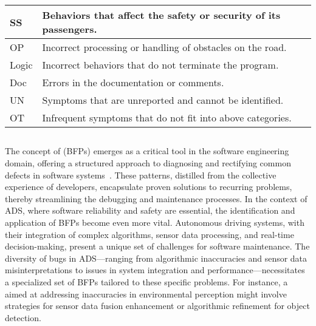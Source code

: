 \begin{table}[ht!]
\begin{minipage}{0.47\linewidth}
\begin{adjustbox}{width=\linewidth}
\begin{tabular}{|l|l|}
        SS & Behaviors that affect the safety or security of its passengers. \\
        \hline
        OP & Incorrect processing or handling of obstacles on the road. \\
        \hline
        Logic & Incorrect behaviors that do not terminate the program. \\
        \hline
        Doc & Errors in the documentation or comments. \\
        \hline
        UN & Symptoms that are unreported and cannot be identified. \\
        \hline
        OT & Infrequent symptoms that do not fit into above categories. \\
        \hline
        \end{tabular}
        \end{adjustbox}
        \label{tab:symptoms_ads}
    \end{minipage}
\end{table}


\subsection{\BFPs}

The concept of \bfps (BFPs) emerges as a critical tool in the software engineering domain, offering a structured approach to diagnosing and rectifying common defects in software systems~\cite{PanKW09,CamposM17}. These patterns, distilled from the collective experience of developers, encapsulate proven solutions to recurring problems, thereby streamlining the debugging and maintenance processes. In the context of ADS, where software reliability and safety are essential, the identification and application of BFPs become even more vital.
Autonomous driving systems, with their integration of complex algorithms, sensor data processing, and real-time decision-making, present a unique set of challenges for software maintenance. The diversity of bugs in ADS---ranging from algorithmic inaccuracies and sensor data misinterpretations to issues in system integration and performance---necessitates a specialized set of BFPs tailored to these specific problems. For instance, a \bfp aimed at addressing inaccuracies in environmental perception might involve strategies for sensor data fusion enhancement or algorithmic refinement for object detection.

